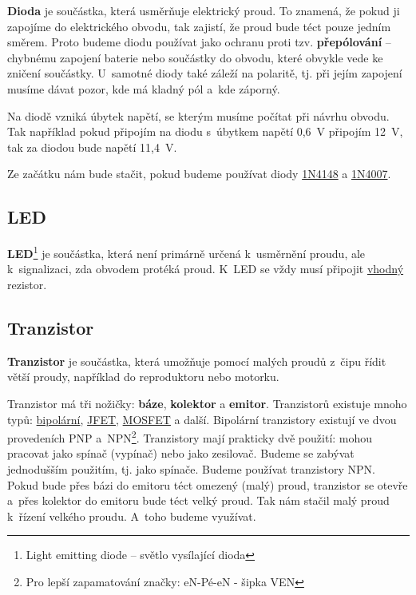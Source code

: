 {\bf Dioda}  je součástka, která usměrňuje elektrický proud. 
To znamená, že pokud ji zapojíme do elektrického obvodu, tak zajistí, že proud bude téct pouze jedním směrem. 
Proto budeme diodu používat jako ochranu 
proti tzv. {\bf přepólování}
 -- chybnému zapojení baterie nebo součástky do obvodu, které obvykle vede ke zničení součástky. 
U~samotné diody také záleží na polaritě, tj. při jejím zapojení musíme dávat pozor, kde má kladný pól a~kde záporný. 

Na diodě vzniká úbytek napětí, se kterým musíme počítat při návrhu obvodu. 
Tak například pokud připojím na diodu s~úbytkem napětí 0,6~V připojím 12~V, tak za diodou bude napětí 11,4~V. 

Ze začátku nám bude stačit, pokud budeme používat diody  
 \hyperlink{1N4148}{1N4148} a 
 \hyperlink{1N4007}{1N4007}.
   
\subsection{LED}

\hypertarget{LED}{}  
{\bf LED}\footnote{Light emitting diode -- světlo vysílající dioda}
je součástka, která není primárně určená k~usměrnění proudu, ale k~signalizaci, zda obvodem protéká proud.
K~LED se vždy musí připojit  \hyperref[vypocet_rezistor]{vhodný} rezistor. 

\subsection{Tranzistor} \label{tranzistor}

{\bf Tranzistor} je součástka, která umožňuje pomocí malých proudů z~čipu řídit větší proudy, například do reproduktoru nebo motorku. 

Tranzistor má tři nožičky: {\bf báze}, {\bf kolektor} a {\bf emitor}. 
Tranzistorů existuje mnoho typů: \href{https://maly.gitbooks.io/hradla-volty-jednocipy/7_polovodice/73_tranzistor.html}{bipolární},
\href{https://maly.gitbooks.io/hradla-volty-jednocipy/7_polovodice/75_tranzistor_rizeny_polem_fet.html}{JFET}, 
\href{https://maly.gitbooks.io/hradla-volty-jednocipy/7_polovodice/77_mosfet.html}{MOSFET} a další. 
Bipolární tranzistory existují ve dvou provedeních PNP a~NPN\footnote{Pro lepší zapamatování značky: eN-Pé-eN - šipka VEN}. 
 Tranzistory mají prakticky dvě použití: mohou pracovat jako spínač (vypínač) nebo jako zesilovač.
  Budeme se zabývat jednodušším použitím, tj. jako spínače. 
  Budeme používat tranzistory NPN. 
  Pokud bude přes bázi do emitoru téct omezený (malý) proud, tranzistor se otevře a~přes kolektor do emitoru bude téct velký proud. 
  Tak nám stačil malý proud k~řízení velkého proudu. A~toho budeme využívat. 

